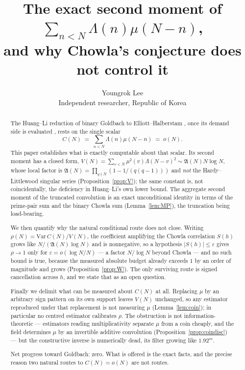 \documentclass[11pt,a4paper]{article}
\title{The exact second moment of
$\sum_{n<N}\Lambda(n)\mu(N-n)$,\\
and why Chowla's conjecture does not control it}
\author{Youngrok Lee\\
\small Independent researcher, Republic of Korea}
\date{}
\theoremstyle{plain}
\theoremstyle{definition}
\theoremstyle{remark}
\newcommand{\AAA}{\mathfrak{A}}
\begin{document}
\maketitle

\begin{abstract}
The Huang--Li reduction of binary Goldbach to Elliott--Halberstam
\cite{HL}, once its demand side is evaluated \cite{P1}, rests on the
single scalar
\[
  C(N)\;=\;\sum_{n<N}\Lambda(n)\mu(N-n)\;=\;o(N).
\]
This paper establishes what is exactly computable about that scalar.
Its second moment has a closed form,
$V(N)=\sum_{v<N}\mu^2(v)\Lambda(N-v)^2\sim\AAA(N)N\log N$, whose local
factor is $\AAA(N)=\prod_{q\nmid N}(1-1/(q(q-1)))$ and \emph{not} the
Hardy--Littlewood singular series (Proposition~\ref{prop:V}); the same
constant is, not coincidentally, the deficiency in Huang--Li's own
lower bound. The aggregate second moment of the truncated convolution
is an exact unconditional identity in terms of the prime-pair sum and
the binary Chowla sum (Lemma~\ref{lem:MP}), the truncation being
load-bearing.

We then quantify why the natural conditional route does not close.
Writing $\rho(N)=\mathrm{Var}\,C(N)/V(N)$, the coefficient amplifying
the Chowla correlation $S(h)$ grows like $N/(\AAA(N)\log N)$ and is
nonnegative, so a hypothesis $|S(h)|\le\varepsilon$ gives $\rho\to1$
only for $\varepsilon=o(\log N/N)$ --- a factor $N/\log N$ beyond
Chowla --- and no such bound is true, because the measured absolute
budget already exceeds $1$ by an order of magnitude and grows
(Proposition~\ref{prop:W}). The only surviving route is signed
cancellation across $h$, and we state that as an open question.

Finally we delimit what can be measured about $C(N)$ at all. Replacing
$\mu$ by an arbitrary sign pattern on its own support leaves $V(N)$
unchanged, so any estimator reproduced under that replacement is not
measuring $\mu$ (Lemma~\ref{lem:coin}); in particular no centred
estimator calibrates $\rho$. The obstruction is not
information-theoretic --- estimators reading multiplicativity separate
$\mu$ from a coin cheaply, and the field determines $\mu$ by an
invertible additive convolution (Proposition~\ref{prop:coindisc}) ---
but the constructive inverse is numerically dead, its filter growing
like $1.92^{m}$.

Net progress toward Goldbach: zero. What is offered is the exact
facts, and the precise reason two natural routes to $C(N)=o(N)$ are
not routes.
\end{abstract}
\end{document}
